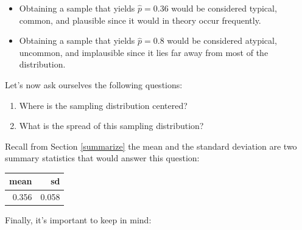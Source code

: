 \documentclass[12pt,]{krantz}
\makeatletter
\newenvironment{Shaded}{\begin{snugshade}}{\end{snugshade}}
\newcommand{\KeywordTok}[1]{\textcolor[rgb]{0.27,0.27,0.27}{\textbf{#1}}}
\newcommand{\DataTypeTok}[1]{\textcolor[rgb]{0.27,0.27,0.27}{#1}}
\newcommand{\StringTok}[1]{\textcolor[rgb]{0.5,0.5,0.5}{#1}}
\newcommand{\OperatorTok}[1]{\textcolor[rgb]{0.43,0.43,0.43}{\textbf{#1}}}
\newcommand{\NormalTok}[1]{#1}
\providecommand{\tightlist}{%
  \setlength{\itemsep}{0pt}\setlength{\parskip}{0pt}}
\newenvironment{kframe}{%
\medskip{}
\setlength{\fboxsep}{.8em}
 \def\at@end@of@kframe{}%
 \ifinner\ifhmode%
  \def\at@end@of@kframe{\end{minipage}}%
  \begin{minipage}{\columnwidth}%
 \fi\fi%
 \def\FrameCommand##1{\hskip\@totalleftmargin \hskip-\fboxsep
 \colorbox{shadecolor}{##1}\hskip-\fboxsep
     \hskip-\linewidth \hskip-\@totalleftmargin \hskip\columnwidth}%
 \MakeFramed {\advance\hsize-\width
   \@totalleftmargin\z@ \linewidth\hsize
   \@setminipage}}%
 {\par\unskip\endMakeFramed%
 \at@end@of@kframe}
\renewenvironment{Shaded}{\begin{kframe}}{\end{kframe}}
\theoremstyle{definition}
\theoremstyle{definition}
\theoremstyle{definition}
\theoremstyle{remark}
\makeatother
\begin{document}
\begin{itemize}
\tightlist
\item
  Obtaining a sample that yields \(\widehat{p} = 0.36\) would be
  considered typical, common, and plausible since it would in theory
  occur frequently.
\item
  Obtaining a sample that yields \(\widehat{p} = 0.8\) would be
  considered atypical, uncommon, and implausible since it lies far away
  from most of the distribution.
\end{itemize}

Let's now ask ourselves the following questions:

\begin{enumerate}
\def\labelenumi{\arabic{enumi}.}
\tightlist
\item
  Where is the sampling distribution centered?
\item
  What is the spread of this sampling distribution?
\end{enumerate}

Recall from Section \ref{summarize} the mean and the standard deviation
are two summary statistics that would answer this question:

\begin{Shaded}
\end{Shaded}

\begin{table}[H]
\centering\begingroup\fontsize{10}{12}\selectfont

\begin{tabular}{r|r}
\hline
mean & sd\\
\hline
0.356 & 0.058\\
\hline
\end{tabular}\endgroup{}
\end{table}

Finally, it's important to keep in mind:
\end{document}
